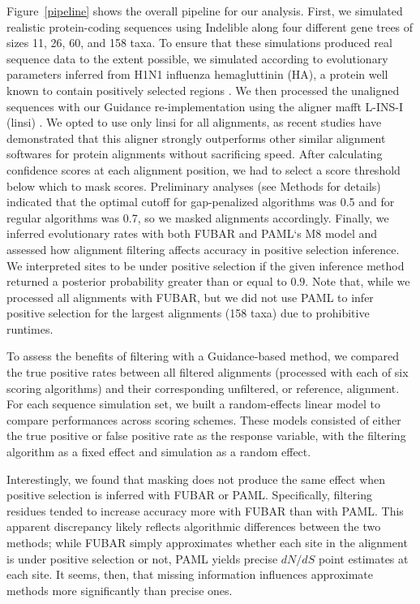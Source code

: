\documentclass[10pt]{article}
\begin{document}
Figure~\ref{pipeline} shows the overall pipeline for our analysis. First, we simulated realistic protein-coding sequences using Indelible \citep{Fletcher2009} along four different gene trees of sizes 11, 26, 60, and 158 taxa. To ensure that these simulations produced real sequence data to the extent possible, we simulated according to evolutionary parameters inferred from H1N1 influenza hemagluttinin (HA), a protein well known to contain positively selected regions \citep{Meyer2012}. We then processed the unaligned sequences with our Guidance re-implementation using the aligner mafft L-INS-I (linsi) \citep{Katoh2005}. We opted to use only linsi for all alignments, as recent studies have demonstrated that this aligner strongly outperforms other similar alignment softwares for protein alignments \citep{Thompson2011,Nuin2006} without sacrificing speed. After calculating confidence scores at each alignment position, we had to select a score threshold below which to mask scores. Preliminary analyses (see Methods for details) indicated that the optimal cutoff for gap-penalized algorithms was 0.5 and for regular algorithms was 0.7, so we masked alignments accordingly. Finally, we inferred evolutionary rates with both FUBAR \citep{Murrell2013} and PAML`s M8 model \citep{Yang2007} and assessed how alignment filtering affects accuracy in positive selection inference. We interpreted sites to be under positive selection if the given inference method returned a posterior probability greater than or equal to $0.9$. Note that, while we processed all alignments with FUBAR, but we did not use PAML to infer positive selection for the largest alignments (158 taxa) due to prohibitive runtimes. 

To assess the benefits of filtering with a Guidance-based method, we compared the true positive rates between all filtered alignments (processed with each of six scoring algorithms) and their corresponding unfiltered, or reference, alignment. For each sequence simulation set, we built a random-effects linear model to compare performances across scoring schemes. These models consisted of either the true positive or false positive rate as the response variable, with the filtering algorithm as a fixed effect and simulation as a random effect. 

Interestingly, we found that masking does not produce the same effect when positive selection is inferred with FUBAR or PAML. Specifically, filtering residues tended to increase accuracy more with FUBAR than with PAML. This apparent discrepancy likely reflects algorithmic differences between the two methods; while FUBAR simply approximates whether each site in the alignment is under positive selection or not, PAML yields precise $dN/dS$ point estimates at each site. It seems, then, that missing information influences approximate methods more significantly than precise ones.
\end{document}
